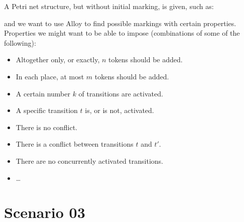 \documentclass{article}
\begin{document}
A Petri net structure, but without initial marking, is given, such as:
\begin{center}
\end{center}
and we want to use Alloy to find possible markings with certain properties.
Properties we might want to be able to impose (combinations of some of the following):
\begin{itemize}
\item
  Altogether only, or exactly, $n$ tokens should be added.
\item
  In each place, at most $m$ tokens should be added.
\item
  A certain number $k$ of transitions are activated.
\item
  A specific transition $t$ is, or is not, activated.
\item
  There is no conflict.
\item
  There is a conflict between transitions $t$ and $t'$.
\item
  There are no concurrently activated transitions.
\item
  \dots
\end{itemize}

\pagebreak

\section*{Scenario 03}
\end{document}
